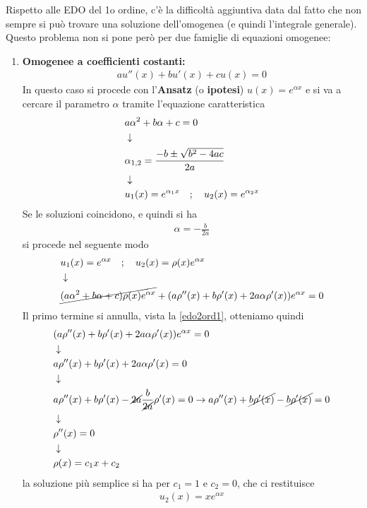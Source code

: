 Rispetto alle EDO del 1o ordine, c'è la difficoltà aggiuntiva data dal fatto che non sempre si può trovare una soluzione dell'omogenea (e quindi l'integrale generale). Questo problema non si pone però per due famiglie di equazioni omogenee:
\begin{enumerate}
	\item \textbf{Omogenee a coefficienti costanti:}
	\begin{align}
		a u''(x) + b u'(x) + c u(x) = 0 \label{edo2ord1}
	\end{align}
	In questo caso si procede con l'\textbf{Ansatz} (o \textbf{ipotesi}) $u(x) = e^{\alpha x}$ e si va a cercare il parametro $\alpha$ tramite l'equazione caratteristica
	\begin{align}
		&a \alpha^2 + b \alpha + c = 0\\ &\downarrow \nonumber \\
		& \alpha_{1,2} = \frac{-b \pm \sqrt{b^2 - 4ac}}{2a} \\ &\downarrow \nonumber \\
		&u_1(x) = e^{\alpha_1 x} \quad ; \quad u_2(x) = e^{\alpha_2 x}
	\end{align}
	Se le soluzioni coincidono, e quindi si ha
	\begin{align}
		\alpha = -\frac{b}{2a}
	\end{align}
	si procede nel seguente modo
	\begin{align}
		&u_1(x) = e^{\alpha x} \quad ; \quad u_2(x) = \rho(x)e^{\alpha x} \\ &\downarrow \nonumber \\
		&\cancel{(a \alpha^2 + b \alpha + c)\rho(x)e^{\alpha x}} + (a \rho''(x) + b \rho'(x) + 2a\alpha \rho'(x))e^{\alpha x} = 0
	\end{align}
	Il primo termine si annulla, vista la \ref{edo2ord1}, otteniamo quindi
	\begin{align}
		&(a \rho''(x) + b \rho'(x) + 2a\alpha \rho'(x))e^{\alpha x} = 0\\ &\downarrow \nonumber \\
		&a \rho''(x) + b \rho'(x) + 2a\alpha \rho'(x)=0 \nonumber \\ &\downarrow \nonumber \\
		&a \rho''(x) + b \rho'(x) - \cancel{2a}\frac{b}{\cancel{2a}} \rho'(x)=0 \to a \rho''(x) + \cancel{b \rho'(x)} - \cancel{b\rho'(x)} =0 \nonumber \\ &\downarrow \nonumber \\
		&\rho''(x) = 0 \nonumber \\ &\downarrow \nonumber \\
		&\rho(x) = c_1x + c_2
	\end{align}
	la soluzione più semplice si ha per $c_1 = 1$ e $c_2 = 0$, che ci restituisce
	\begin{align}
		u_2(x) = x e^{\alpha x}
	\end{align}
	

\end{enumerate}
